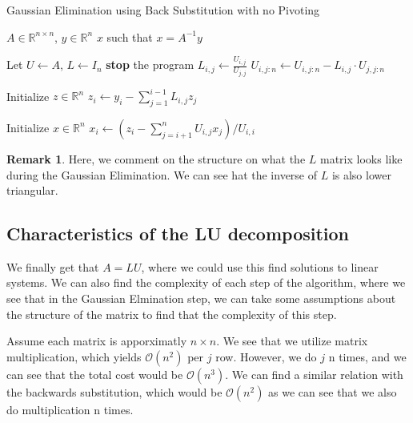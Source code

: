 \documentclass[11pt]{article}
\theoremstyle{definition}
\newtheorem{remark}{Remark}[section]
\newcommand{\bigO}[1]{\mathcal{O}\left(#1\right)}
\begin{document}
\begin{algorithm}[H]
  \caption{Gaussian Elimination using Back Substitution with no Pivoting}
  \begin{algorithmic}[1]
    \Require $A \in \mathbb{R}^{n \times n}$, $y \in \mathbb{R}^n$
    \Ensure $x$ such that $x = A^{-1}y$
    
    \State Let $U \gets A$, $L \gets I_n$
                \State \textbf{stop} the program 
            \EndIf
            \State $L_{i,j} \gets \frac{U_{i,j}}{U_{j,j}}$
            \State $U_{i, j:n} \gets U_{i, j:n} - L_{i,j} \cdot U_{j, j:n}$
        \EndFor
    \EndFor

    \State Initialize $z \in \mathbb{R}^n$
        \State $z_i \gets y_i - \sum_{j=1}^{i-1} L_{i,j} z_j$
    \EndFor

    \State Initialize $x \in \mathbb{R}^n$
        \State $x_i \gets \left(z_i - \sum_{j=i+1}^{n} U_{i,j} x_j \right) / U_{i,i}$
    \EndFor
  \end{algorithmic}
\end{algorithm}
\begin{remark}
  Here, we comment on the structure on what the $L$ matrix looks like during the Gaussian Elimination. We can see hat the inverse of $L$ is also lower triangular. 
\end{remark}
\subsection{Characteristics of the LU decomposition}
We finally get that $A = LU$, where we could use this find solutions to linear systems. We can also find the complexity of each step of the algorithm, where we see that in the Gaussian Elmination step, we can take some assumptions about the structure of the matrix to find that the complexity of this step. 


Assume each matrix is apporximatly $n \times n$. We see that we utilize matrix multiplication, which yields $\bigO{n^2}$ per $j$ row. However, we do $j$ n times, and we can see that the total cost would be $\bigO{n^3}$. We can find a similar relation with the backwards substitution, which would be $\bigO{n^2}$ as we can see that we also do multiplication n times.  
\end{document}

